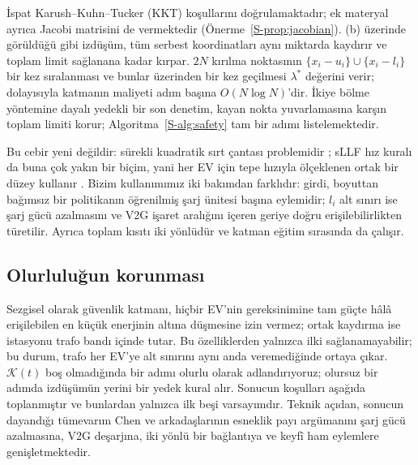 İspat Karush--Kuhn--Tucker (KKT) koşullarını doğrulamaktadır; ek materyal ayrıca Jacobi matrisini de vermektedir (Önerme~\ref{S-prop:jacobian}).
(b) üzerinde görüldüğü gibi izdüşüm, tüm serbest koordinatları aynı miktarda kaydırır ve toplam limit sağlanana kadar kırpar.
$2N$ kırılma noktasının $\{x_i-u_i\}\cup\{x_i-l_i\}$ bir kez sıralanması ve bunlar üzerinden bir kez geçilmesi $\lambda^{*}$ değerini verir; dolayısıyla katmanın maliyeti adım başına $O(N\log N)$'dir.
İkiye bölme yöntemine dayalı yedekli bir son denetim, kayan nokta yuvarlamasına karşın toplam limiti korur; Algoritma~\ref{S-alg:safety} tam bir adımı listelemektedir.

Bu cebir yeni değildir:  sürekli kuadratik sırt çantası problemidir \cite{kiwiel2007breakpoint,wang2022efficient}; sLLF hız kuralı da buna çok yakın bir biçim, yani her EV için tepe hızıyla ölçeklenen ortak bir düzey kullanır \cite{chen2022smoothed}.
Bizim kullanımımız iki bakımdan farklıdır: girdi, boyuttan bağımsız bir politikanın öğrenilmiş şarj ünitesi başına eylemidir; $l_i$ alt sınırı ise şarj gücü azalmasını ve V2G işaret aralığını içeren geriye doğru erişilebilirlikten türetilir.
Ayrıca toplam kısıtı iki yönlüdür ve katman eğitim sırasında da çalışır.

\subsection{Olurluluğun korunması}\label{sec:invariance}

Sezgisel olarak güvenlik katmanı, hiçbir EV'nin gereksinimine tam güçte hâlâ erişilebilen en küçük enerjinin altına düşmesine izin vermez; ortak kaydırma ise istasyonu trafo bandı içinde tutar.
Bu özelliklerden yalnızca ilki sağlanamayabilir; bu durum, trafo her EV'ye alt sınırını aynı anda veremediğinde ortaya çıkar.
$\mathcal K(t)$ boş olmadığında bir adımı olurlu olarak adlandırıyoruz; olursuz bir adımda izdüşümün yerini bir yedek kural alır.
Sonucun koşulları aşağıda toplanmıştır ve bunlardan yalnızca ilk beşi varsayımdır.
Teknik açıdan, sonucun dayandığı tümevarım Chen ve arkadaşlarının esneklik payı argümanını \cite{chen2022smoothed} şarj gücü azalmasına, V2G deşarjına, iki yönlü bir bağlantıya ve keyfî ham eylemlere genişletmektedir.

